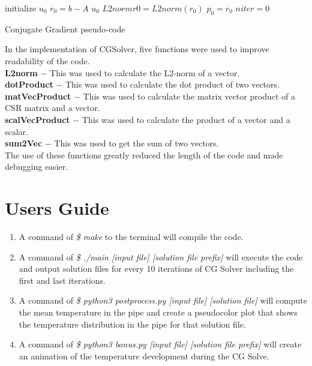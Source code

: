 \documentclass{article}
\begin{document}
\begin{algorithm}[H]
 \SetAlgoLined
 initialize $u_0$\;
 $r_0 = b - A$ $u_0$\;
 $L2normr0 = L2norm(r_0)$\;
 $p_0 = r_0$\;
 $niter = 0$\;
 \caption{Conjugate Gradient pseudo-code}
\end{algorithm}
In the implementation of CGSolver, five functions were used to improve readability
of the code.\\
\textbf{L2norm} $-$ This was used to calculate the L2-norm of a vector.\\
\textbf{dotProduct} $-$ This was used to calculate the dot product of two vectors.\\
\textbf{matVecProduct} $-$ This was used to calculate the matrix vector product of a
CSR matrix and a vector.\\
\textbf{scalVecProduct} $-$ This was used to calculate the product of a vector and a
scalar.\\
\textbf{sum2Vec} $-$ This was used to get the sum of two vectors.\\
The use of these functions greatly reduced the length of the code and made
debugging easier.

\section{Users Guide}
\begin{enumerate}
\item A command of \emph{\$ make} to the terminal will compile the code.
\item A command of \emph{\$ ./main [input file] [solution file prefix]} will execute
the code and output solution files for every 10 iterations of CG Solver including the
first and last iterations.
\item A command of \emph{\$ python3 postprocess.py [input file] [solution file]} will
compute the mean temperature in the pipe and create a pseudocolor plot that shows
the temperature distribution in the pipe for that solution file.
\item A command of \emph{\$ python3 bonus.py [input file] [solution file prefix]} will
create an animation of the temperature development during the CG Solve.
\end{enumerate}
\end{document}
